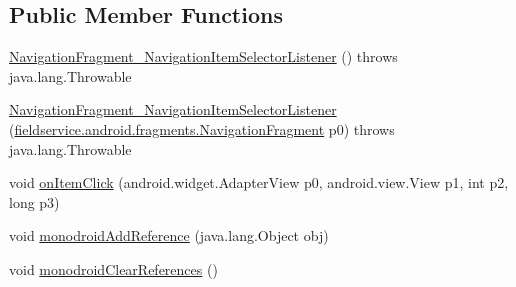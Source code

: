 \subsection*{Public Member Functions}
\begin{DoxyCompactItemize}
\item 
\hyperlink{classfieldservice_1_1android_1_1fragments_1_1_navigation_fragment___navigation_item_selector_listener_ac966fbd47dd16983f7fc9b02b9e14830}{Navigation\+Fragment\+\_\+\+Navigation\+Item\+Selector\+Listener} ()  throws java.\+lang.\+Throwable 	
\item 
\hyperlink{classfieldservice_1_1android_1_1fragments_1_1_navigation_fragment___navigation_item_selector_listener_a48949a060c42dc6dc270a9b0b6cd21bd}{Navigation\+Fragment\+\_\+\+Navigation\+Item\+Selector\+Listener} (\hyperlink{classfieldservice_1_1android_1_1fragments_1_1_navigation_fragment}{fieldservice.\+android.\+fragments.\+Navigation\+Fragment} p0)  throws java.\+lang.\+Throwable 	
\item 
void \hyperlink{classfieldservice_1_1android_1_1fragments_1_1_navigation_fragment___navigation_item_selector_listener_abe1a65fb45d8c28bc9708c8299e83d80}{on\+Item\+Click} (android.\+widget.\+Adapter\+View p0, android.\+view.\+View p1, int p2, long p3)
\item 
void \hyperlink{classfieldservice_1_1android_1_1fragments_1_1_navigation_fragment___navigation_item_selector_listener_a93e18eb55754dc7ea290cc6e72efb7f8}{monodroid\+Add\+Reference} (java.\+lang.\+Object obj)
\item 
void \hyperlink{classfieldservice_1_1android_1_1fragments_1_1_navigation_fragment___navigation_item_selector_listener_a8d6df1f07c910891147b513c5f405323}{monodroid\+Clear\+References} ()
\end{DoxyCompactItemize}


